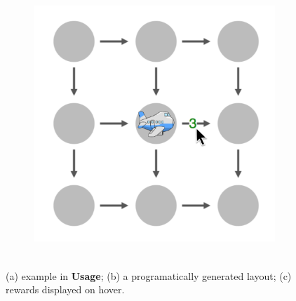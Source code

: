 \documentclass[final]{beamer}
\newlength{\twocolwid}
\begin{document}
\begin{frame}[t, fragile]
\begin{columns}[t]
\begin{column}{\twocolwid}
\begin{figure}
\begin{subfigure}{.28\textwidth}
      \centering
      \includegraphics[height=10cm]{figs/grid2.png}
      \caption{}
      \label{fig:hover}
    \end{subfigure}
    \caption{(a) example in \textbf{Usage}; (b) a programatically generated layout; (c) rewards displayed on hover.}
    \label{fig:test}
  \end{figure}



\end{column}
\end{columns}
\end{frame}
\end{document}
